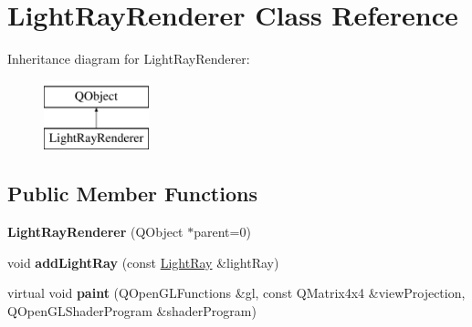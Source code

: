 \hypertarget{class_light_ray_renderer}{}\section{Light\+Ray\+Renderer Class Reference}
\label{class_light_ray_renderer}
Inheritance diagram for Light\+Ray\+Renderer\+:\begin{figure}[H]
\begin{center}
\leavevmode
\includegraphics[height=2.000000cm]{class_light_ray_renderer}
\end{center}
\end{figure}
\subsection*{Public Member Functions}
\begin{DoxyCompactItemize}
\item 
\hypertarget{class_light_ray_renderer_a081e83e5e16a36faec002878052aab04}{}{\bfseries Light\+Ray\+Renderer} (Q\+Object $\ast$parent=0)\label{class_light_ray_renderer_a081e83e5e16a36faec002878052aab04}

\item 
\hypertarget{class_light_ray_renderer_a0e481c5c466f2423e06adfde398f6a28}{}void {\bfseries add\+Light\+Ray} (const \hyperlink{class_light_ray}{Light\+Ray} \&light\+Ray)\label{class_light_ray_renderer_a0e481c5c466f2423e06adfde398f6a28}

\item 
\hypertarget{class_light_ray_renderer_a3270c30bd4f5eba01e543bb196c501ed}{}virtual void {\bfseries paint} (Q\+Open\+G\+L\+Functions \&gl, const Q\+Matrix4x4 \&view\+Projection, Q\+Open\+G\+L\+Shader\+Program \&shader\+Program)\label{class_light_ray_renderer_a3270c30bd4f5eba01e543bb196c501ed}

\end{DoxyCompactItemize}
